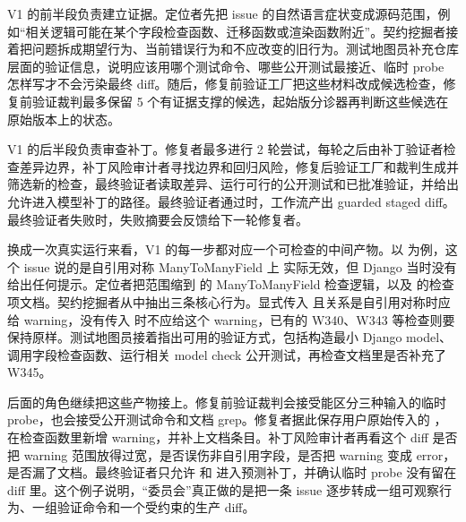 \documentclass[UTF8,a4paper,11pt]{ctexart}
\newcommand{\inst}[1]{\texttt{\detokenize{#1}}}
\begin{document}
V1 的前半段负责建立证据。定位者先把 issue 的自然语言症状变成源码范围，例如“相关逻辑可能在某个字段检查函数、迁移函数或渲染函数附近”。契约挖掘者接着把问题拆成期望行为、当前错误行为和不应改变的旧行为。测试地图员补充仓库层面的验证信息，说明应该用哪个测试命令、哪些公开测试最接近、临时 probe 怎样写才不会污染最终 diff。随后，修复前验证工厂把这些材料改成候选检查，修复前验证裁判最多保留 5 个有证据支撑的候选，起始版分诊器再判断这些候选在原始版本上的状态。

V1 的后半段负责审查补丁。修复者最多进行 2 轮尝试，每轮之后由补丁验证者检查差异边界，补丁风险审计者寻找边界和回归风险，修复后验证工厂和裁判生成并筛选新的检查，最终验证者读取差异、运行可行的公开测试和已批准验证，并给出允许进入模型补丁的路径。最终验证者通过时，工作流产出 guarded staged diff。最终验证者失败时，失败摘要会反馈给下一轮修复者。

换成一次真实运行来看，V1 的每一步都对应一个可检查的中间产物。以 \inst{django__django-14730} 为例，这个 issue 说的是自引用对称 ManyToManyField 上  实际无效，但 Django 当时没有给出任何提示。定位者把范围缩到  的 ManyToManyField 检查逻辑，以及  的检查项文档。契约挖掘者从中抽出三条核心行为。显式传入  且关系是自引用对称时应给 warning，没有传入  时不应给这个 warning，已有的 W340、W343 等检查则要保持原样。测试地图员接着指出可用的验证方式，包括构造最小 Django model、调用字段检查函数、运行相关 model check 公开测试，再检查文档里是否补充了 W345。

后面的角色继续把这些产物接上。修复前验证裁判会接受能区分三种输入的临时 probe，也会接受公开测试命令和文档 grep。修复者据此保存用户原始传入的 ，在检查函数里新增  warning，并补上文档条目。补丁风险审计者再看这个 diff 是否把 warning 范围放得过宽，是否误伤非自引用字段，是否把 warning 变成 error，是否漏了文档。最终验证者只允许  和  进入预测补丁，并确认临时 probe 没有留在 diff 里。这个例子说明，“委员会”真正做的是把一条 issue 逐步转成一组可观察行为、一组验证命令和一个受约束的生产 diff。
\end{document}
